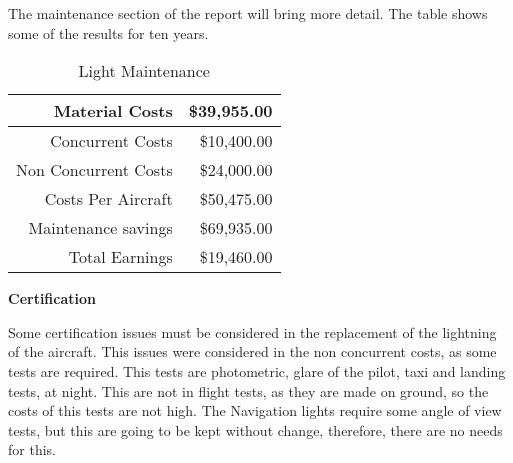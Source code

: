 The maintenance section of the report will bring more detail. The table  shows some of the results for ten years.

\begin{table}[htbp]
  \centering
  \caption{Light Maintenance}
    \begin{tabular}{rr}
    \toprule
    Material Costs & \$39,955.00 \\
    \midrule
    Concurrent Costs & \$10,400.00 \\
    Non Concurrent Costs & \$24,000.00 \\
    Costs Per Aircraft & \$50,475.00 \\
    Maintenance savings & \$69,935.00 \\
    Total Earnings & \$19,460.00 \\
    \bottomrule
    \end{tabular}%
  \label{tab:LightMaintenance}%
\end{table}%

\textbf{Certification}

Some certification issues must be considered in the replacement of the lightning of the aircraft. This issues were considered in the non concurrent costs, as some tests are required. This tests are photometric, glare of the pilot, taxi and landing tests, at night. This are not in flight tests, as they are made on ground, so the costs of this tests are not high. The Navigation lights require some angle of view tests, but this are going to be kept without change, therefore, there are no needs for this.




